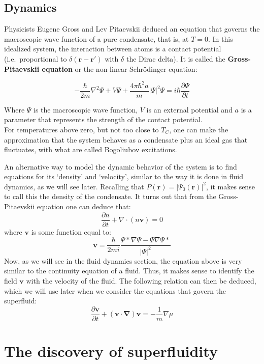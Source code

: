 \documentclass{article}
\begin{document}
\subsection{Dynamics}

Physicists Eugene Gross and Lev Pitaevskii deduced an equation that governs the macroscopic wave function of a pure condensate, that is, at $T = 0$.  In this idealized system, the interaction between atoms is a contact potential (i.e.\ proportional to $\delta(\mathbf{r}-\mathbf{r}')$ with $\delta$ the Dirac delta). It is called the \textbf{Gross-Pitaevskii equation} or the non-linear Schrödinger equation:

\[-\frac{\hbar}{2m}\nabla^2\Psi+V\Psi+\frac{4\pi\hbar^2a}{m}|\Psi|^2\Psi=i\hbar \frac{\partial \Psi}{\partial t}\]

Where $\Psi$ is the macroscopic wave function, $V$ is an external potential and $a$ is a parameter that represents the strength of the contact potential.
\\

For temperatures above zero, but not too close to $T_C$, one can make the approximation that the system behaves as a condensate plus an ideal gas that fluctuates, with what are called Bogoliubov excitations.

An alternative way to model the dynamic behavior of the system is to find equations for its `density' and `velocity', similar to the way it is done in fluid dynamics, as we will see later.  Recalling that $P(\mathbf{r}) = |\Psi_0(\mathbf{r})|^2$, it makes sense to call this the density of the condensate.  It turns out that from the Gross-Pitaevskii equation one can deduce that:
\[\frac{\partial n}{\partial t} + \nabla \cdot (n \mathbf{v}) = 0\]
where $\mathbf{v}$ is some function equal to:
\[\mathbf{v} = \frac{\hbar}{2mi}\frac{\Psi*\nabla\Psi-\Psi\nabla\Psi*}{|\Psi|^2}\]
Now, as we will see in the fluid dynamics section, the equation above is very similar to the continuity equation of a fluid.  Thus, it makes sense to identify the field $\mathbf{v}$ with the velocity of the fluid.  The following relation can then be deduced, which we will use later when we consider the equations that govern the superfluid:
\begin{equation}\label{euler}
    \frac{\partial \mathbf{v}}{\partial t} + (\mathbf{v}\cdot \mathbf{\nabla})\mathbf{v} = -\frac{1}{m}\nabla \mu
\end{equation}

\section{The discovery of superfluidity}
\end{document}

